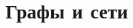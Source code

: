 \documentclass[unicode,11pt,notheorems]{beamer}
\begin{document}
%
%
%
%
%
%
%
%
%
%     
%
%
%
%
%
%
%
%
%
%
%
%
%






\section{Графы и сети}
\begin{frame}{}
\centering \bfseries \Large {}
\end{frame}
\end{document}
